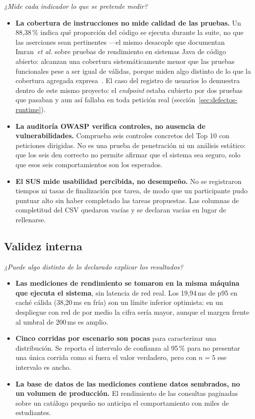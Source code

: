 \documentclass[11pt,a4paper]{article}
\begin{document}
\emph{¿Mide cada indicador lo que se pretende medir?}

\begin{itemize}[leftmargin=*]
  \item \textbf{La cobertura de instrucciones no mide calidad de las
    pruebas.} Un 88,38\,\% indica qué proporción del código se ejecuta
    durante la suite, no que las aserciones sean pertinentes —el mismo
    desacople que documentan Imran~\emph{et al.} sobre pruebas de
    rendimiento en sistemas Java de código abierto: alcanzan una
    cobertura sistemáticamente menor que las pruebas funcionales pese a
    ser igual de válidas, porque miden algo distinto de lo que la
    cobertura agregada expresa~\cite{imran2025coverage}. El caso del
    registro de usuarios lo demuestra dentro de este mismo proyecto: el
    \emph{endpoint} estaba cubierto por dos pruebas que pasaban y aun así
    fallaba en toda petición real (sección~\ref{sec:defectos-runtime}).
  \item \textbf{La auditoría OWASP verifica controles, no ausencia de
    vulnerabilidades.} Comprueba seis controles concretos del Top 10 con
    peticiones dirigidas. No es una prueba de penetración ni un análisis
    estático: que los seis den correcto no permite afirmar que el sistema
    sea seguro, solo que esos seis comportamientos son los esperados.
  \item \textbf{El SUS mide usabilidad percibida, no desempeño.} No se
    registraron tiempos ni tasas de finalización por tarea, de modo que un
    participante pudo puntuar alto sin haber completado las tareas
    propuestas. Las columnas de completitud del CSV quedaron vacías y se
    declaran vacías en lugar de rellenarse.
\end{itemize}

\subsection{Validez interna}

\emph{¿Puede algo distinto de lo declarado explicar los resultados?}

\begin{itemize}[leftmargin=*]
  \item \textbf{Las mediciones de rendimiento se tomaron en la misma
    máquina que ejecuta el sistema}, sin latencia de red real. Los
    19,94\,ms de p95 en caché cálida (38,20\,ms en fría) son un límite
    inferior optimista: en un despliegue con red de por medio la cifra
    sería mayor, aunque el margen frente al umbral de 200\,ms es amplio.
  \item \textbf{Cinco corridas por escenario son pocas} para caracterizar
    una distribución. Se reporta el intervalo de confianza al 95\,\% para
    no presentar una única corrida como si fuera el valor verdadero, pero
    con $n=5$ ese intervalo es ancho.
  \item \textbf{La base de datos de las mediciones contiene datos
    sembrados, no un volumen de producción.} El rendimiento de las
    consultas paginadas sobre un catálogo pequeño no anticipa el
    comportamiento con miles de estudiantes.
\end{itemize}
\end{document}
